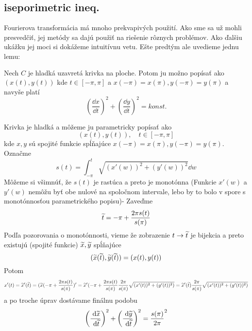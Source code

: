 \subsection{iseporimetric ineq.}

Fourierova transformácia má mnoho prekvapivých použití. Ako sme sa už
mohli presvedčiť, jej metódy sa dajú použiť na riešenie rôznych
problémov. Ako ďalšiu ukážku jej moci si dokážeme intuitívnu vetu.
Ešte predtým ale uvedieme jednu lemu:
\begin{lema}
  Nech $C$ je hladká uzavretá krivka na ploche. Potom ju možno popísať
  ako $(x(t),y(t))$ kde $t\in[-\pi,\pi]$ a $x(-\pi)=x(\pi),
  y(-\pi)=y(\pi)$ a navyše platí
  \begin{equation}
    \left(\frac{\dd x}{\dd t}\right)^2 +
    \left(\frac{\dd y}{\dd t}\right)^2 = konst.
  \end{equation}    
  \label{lema:ekvidist_parametric}
\end{lema}
\begin{dokaz}
    Krivka je hladká a môžeme ju parametricky popísať ako
    \begin{equation}
        \left(x(t),y(t)\right), \quad t\in[-\pi,\pi]
    \end{equation}
    kde $x,y$ sú spojité funkcie spĺňajúce $x(-\pi)=x(\pi), y(-\pi)=y(\pi)$.
  Označme
   \begin{equation}
        s(t) = \int_{-\pi}^t \sqrt{ (x'(w))^2 + (y'(w))^2} \dd w
   \end{equation}
   Môžeme si všimnúť, že $s(t)$ je rastúca a preto je monotónna
   (Funkcie $x'(w)$ a $y'(w)$ nemôžu byť obe nulové na spoločnom intervale,
   lebo by to bolo v spore s monotónnosťou parametrického popisu)-
   Zaveďme
    \begin{equation}
        \widetilde{t} = -\pi + \frac{2 \pi s(t)}{s(\pi)}
    \end{equation}
   Podľa pozorovania o monotónnosti, vieme že zobrazenie
   $t\rightarrow \widetilde{t}$ je bijekcia a preto existujú (spojité funkcie)
   $\widetilde{x},\widetilde{y}$ spĺňajúce
   \begin{equation}
        (\widetilde{x}(\widetilde{t}),\widetilde{y}(\widetilde{t})) = (x(t),y(t))
   \end{equation}
   Potom
   \begin{equation}
        x'(t) = \widetilde{x}'(\widetilde{t}) =
        (\widetilde{x}(-\pi + \frac{2 \pi s(t)}{s(\pi)})' =
        \widetilde{x}'(-\pi + \frac{2 \pi s(t)}{s(\pi)} 
        \frac{2\pi}{s(\pi)}
        \sqrt{ (x'(t))^2 + (y'(t))^2)} =
        \widetilde{x}'(\widetilde{t}) \frac{2\pi}{s(\pi)}
        \sqrt{ (x'(t))^2 + (y'(t))^2)}
   \end{equation}
   a po troche úprav dostávame finálnu podobu   
   \begin{equation}
    \left(\frac{\; \mathrm{d} \widetilde{x}}{\; \mathrm{d} \widetilde{t}}\right)^2 +
    \left(\frac{\; \mathrm{d} \widetilde{y}}{\; \mathrm{d} \widetilde{t}}\right)^2 = 
    \frac{s(\pi)}{2\pi}^2
    \label{eq:ekvidist_parametric}
   \end{equation}
\end{dokaz}

